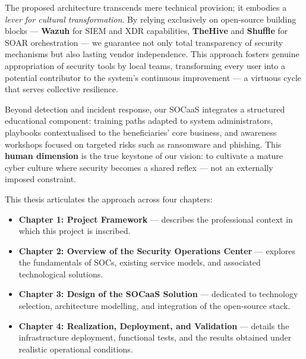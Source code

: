 The proposed architecture transcends mere technical provision; it embodies a \textit{lever for cultural transformation}. By relying exclusively on open-source building blocks --- \textbf{Wazuh} for SIEM and XDR capabilities, \textbf{TheHive} and \textbf{Shuffle} for SOAR orchestration --- we guarantee not only total transparency of security mechanisms but also lasting vendor independence. This approach fosters genuine appropriation of security tools by local teams, transforming every user into a potential contributor to the system's continuous improvement --- a virtuous cycle that serves collective resilience.

Beyond detection and incident response, our SOCaaS integrates a structured educational component: training paths adapted to system administrators, playbooks contextualised to the beneficiaries' core business, and awareness workshops focused on targeted risks such as ransomware and phishing. This \textbf{human dimension} is the true keystone of our vision: to cultivate a mature cyber culture where security becomes a shared reflex --- not an externally imposed constraint.

This thesis articulates the approach across four chapters:

\begin{itemize}
    \item \textbf{Chapter 1: Project Framework} --- describes the professional context in which this project is inscribed.
    \item \textbf{Chapter 2: Overview of the Security Operations Center} --- explores the fundamentals of SOCs, existing service models, and associated technological solutions.
    \item \textbf{Chapter 3: Design of the SOCaaS Solution} --- dedicated to technology selection, architecture modelling, and integration of the open-source stack.
    \item \textbf{Chapter 4: Realization, Deployment, and Validation} --- details the infrastructure deployment, functional tests, and the results obtained under realistic operational conditions.
\end{itemize}